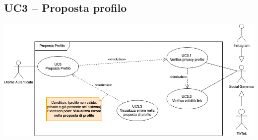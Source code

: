 \subsection{UC3 – Proposta profilo}
\begin{center}
\includegraphics[scale=0.5]{UC_images/UC3.png}
\end{center}
